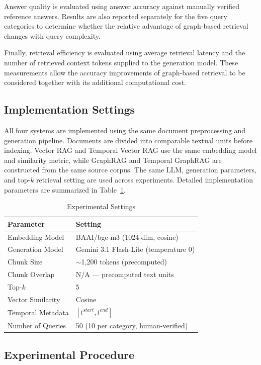 \documentclass[conference]{IEEEtran}
\numberwithin{equation}{section}
\begin{document}
Answer quality is evaluated using answer accuracy against manually verified reference answers. Results are also reported separately for the five query categories to determine whether the relative advantage of graph-based retrieval changes with query complexity.

Finally, retrieval efficiency is evaluated using average retrieval latency and the number of retrieved context tokens supplied to the generation model. These measurements allow the accuracy improvements of graph-based retrieval to be considered together with its additional computational cost.

\subsection{Implementation Settings}

All four systems are implemented using the same document preprocessing and generation pipeline. Documents are divided into comparable textual units before indexing. Vector RAG and Temporal Vector RAG use the same embedding model and similarity metric, while GraphRAG and Temporal GraphRAG are constructed from the same source corpus. The same LLM, generation parameters, and top-$k$ retrieval setting are used across experiments. Detailed implementation parameters are summarized in Table~\ref{tab:settings}.

\begin{table}[!htbp]
\caption{Experimental Settings}
\label{tab:settings}
\centering
\begin{tabular}{ll}
\hline
\textbf{Parameter} & \textbf{Setting} \\
\hline
Embedding Model & BAAI/bge-m3 (1024-dim, cosine) \\
Generation Model & Gemini 3.1 Flash-Lite (temperature 0) \\
Chunk Size & $\sim$1,200 tokens (precomputed) \\
Chunk Overlap & N/A --- precomputed text units \\
Top-$k$ & 5 \\
Vector Similarity & Cosine \\
Temporal Metadata & $[t^{start},t^{end}]$ \\
Number of Queries & 50 (10 per category, human-verified) \\
\hline
\end{tabular}
\end{table}


\subsection{Experimental Procedure}
\end{document}
